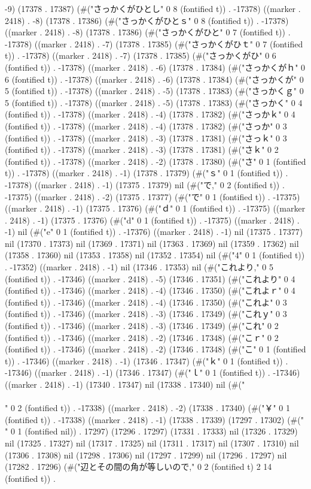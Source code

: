 -9) (17378 . 17387) (#("さっかくがひとし" 0 8 (fontified t)) . -17378) ((marker . 2418) . -8) (17378 . 17386) (#("さっかくがひとｓ" 0 8 (fontified t)) . -17378) ((marker . 2418) . -8) (17378 . 17386) (#("さっかくがひと" 0 7 (fontified t)) . -17378) ((marker . 2418) . -7) (17378 . 17385) (#("さっかくがひｔ" 0 7 (fontified t)) . -17378) ((marker . 2418) . -7) (17378 . 17385) (#("さっかくがひ" 0 6 (fontified t)) . -17378) ((marker . 2418) . -6) (17378 . 17384) (#("さっかくがｈ" 0 6 (fontified t)) . -17378) ((marker . 2418) . -6) (17378 . 17384) (#("さっかくが" 0 5 (fontified t)) . -17378) ((marker . 2418) . -5) (17378 . 17383) (#("さっかくｇ" 0 5 (fontified t)) . -17378) ((marker . 2418) . -5) (17378 . 17383) (#("さっかく" 0 4 (fontified t)) . -17378) ((marker . 2418) . -4) (17378 . 17382) (#("さっかｋ" 0 4 (fontified t)) . -17378) ((marker . 2418) . -4) (17378 . 17382) (#("さっか" 0 3 (fontified t)) . -17378) ((marker . 2418) . -3) (17378 . 17381) (#("さっｋ" 0 3 (fontified t)) . -17378) ((marker . 2418) . -3) (17378 . 17381) (#("さｋ" 0 2 (fontified t)) . -17378) ((marker . 2418) . -2) (17378 . 17380) (#("さ" 0 1 (fontified t)) . -17378) ((marker . 2418) . -1) (17378 . 17379) (#("ｓ" 0 1 (fontified t)) . -17378) ((marker . 2418) . -1) (17375 . 17379) nil (#("で," 0 2 (fontified t)) . -17375) ((marker . 2418) . -2) (17375 . 17377) (#("で" 0 1 (fontified t)) . -17375) ((marker . 2418) . -1) (17375 . 17376) (#("ｄ" 0 1 (fontified t)) . -17375) ((marker . 2418) . -1) (17375 . 17376) (#("d" 0 1 (fontified t)) . -17375) ((marker . 2418) . -1) nil (#("e" 0 1 (fontified t)) . -17376) ((marker . 2418) . -1) nil (17375 . 17377) nil (17370 . 17373) nil (17369 . 17371) nil (17363 . 17369) nil (17359 . 17362) nil (17358 . 17360) nil (17353 . 17358) nil (17352 . 17354) nil (#("4" 0 1 (fontified t)) . -17352) ((marker . 2418) . -1) nil (17346 . 17353) nil (#("これより," 0 5 (fontified t)) . -17346) ((marker . 2418) . -5) (17346 . 17351) (#("これより" 0 4 (fontified t)) . -17346) ((marker . 2418) . -4) (17346 . 17350) (#("これよｒ" 0 4 (fontified t)) . -17346) ((marker . 2418) . -4) (17346 . 17350) (#("これよ" 0 3 (fontified t)) . -17346) ((marker . 2418) . -3) (17346 . 17349) (#("これｙ" 0 3 (fontified t)) . -17346) ((marker . 2418) . -3) (17346 . 17349) (#("これ" 0 2 (fontified t)) . -17346) ((marker . 2418) . -2) (17346 . 17348) (#("こｒ" 0 2 (fontified t)) . -17346) ((marker . 2418) . -2) (17346 . 17348) (#("こ" 0 1 (fontified t)) . -17346) ((marker . 2418) . -1) (17346 . 17347) (#("ｋ" 0 1 (fontified t)) . -17346) ((marker . 2418) . -1) (17346 . 17347) (#("ｌ" 0 1 (fontified t)) . -17346) ((marker . 2418) . -1) (17340 . 17347) nil (17338 . 17340) nil (#("\\\\" 0 2 (fontified t)) . -17338) ((marker . 2418) . -2) (17338 . 17340) (#("￥" 0 1 (fontified t)) . -17338) ((marker . 2418) . -1) (17338 . 17339) (17297 . 17302) (#(" " 0 1 (fontified nil)) . 17297) (17296 . 17297) (17331 . 17333) nil (17326 . 17329) nil (17325 . 17327) nil (17317 . 17325) nil (17311 . 17317) nil (17307 . 17310) nil (17306 . 17308) nil (17298 . 17306) nil (17297 . 17299) nil (17296 . 17297) nil (17282 . 17296) (#("辺とその間の角が等しいので," 0 2 (fontified t) 2 14 (fontified t)) . 